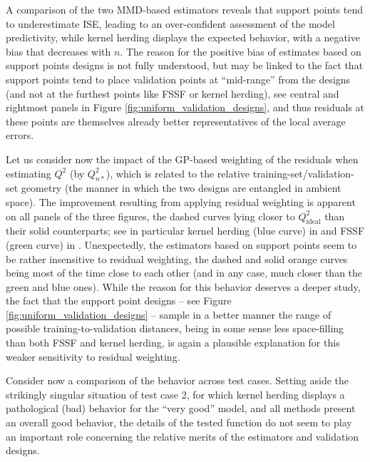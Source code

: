 A comparison of the two MMD-based estimators reveals that support points tend to underestimate ISE, leading to an over-confident assessment of the model predictivity, while kernel herding displays the expected behavior, with a negative bias that decreases with $n$. 
The reason for the positive bias of estimates based on support points designs is not fully understood, but may be linked to the fact that support points tend to place validation points at ``mid-range'' from the designs (and not at the furthest points like FSSF or kernel herding), see central and rightmost panels in Figure \ref{fig:uniform_validation_designs}, and thus residuals at these points are themselves already better representatives of the local average errors. 

Let us consider now the impact of the GP-based weighting of the residuals when estimating $Q^2$ (by $Q_{n*}^2$), which is related to the relative training-set/validation-set geometry (the manner in which the two designs are entangled in ambient space). 
The improvement resulting from applying residual weighting is apparent on all panels of the three figures, the dashed curves lying closer to $Q_{\mathrm{ideal}}^2$ than their solid counterparts; see in particular kernel herding (blue curve) in  and FSSF (green curve) in . 
Unexpectedly, the estimators based on support points seem to be rather insensitive to residual weighting, the dashed and solid orange curves being most of the time close to each other (and in any case, much closer than the green and blue ones). 
While the reason for this behavior deserves a deeper study, the fact that the support point designs -- see Figure \ref{fig:uniform_validation_designs} -- sample in a better manner the range of possible training-to-validation distances, being in some sense less space-filling than both FSSF and kernel herding, is again a plausible explanation for this weaker sensitivity to residual weighting.


Consider now a comparison of the behavior across test cases. 
Setting aside the strikingly singular situation of test case 2, for which kernel herding displays a pathological (bad) behavior for the ``very good'' model, 
and all methods present an overall good behavior, 
the details of the tested function do not seem to play an important role concerning the relative merits of the estimators and validation designs.

